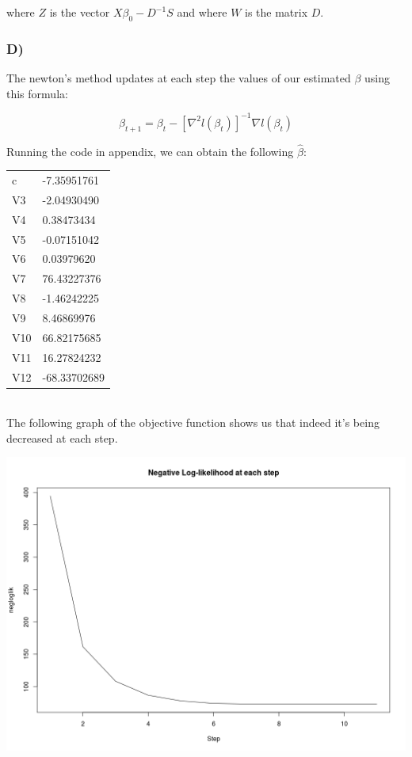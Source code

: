 \documentclass{article}
\begin{document}
where $Z$ is the vector $X\beta_0-D^{-1}S$ and where $W$ is the matrix $D$.

\subsubsection*{D)}

The newton's method updates at each step the values of our estimated $\beta$ using this formula:

\begin{equation*}
\beta_{t+1}=\beta_t-[\nabla^2 l(\beta_t)]^{-1}\nabla l(\beta_t)
\end{equation*}

Running the code in appendix, we can obtain the following $\hat{\beta}$:\\

\begin{tabular}{ll}
c			 &-7.35951761\\
V3           &-2.04930490\\
V4           & 0.38473434\\
V5           &-0.07151042\\
V6           & 0.03979620\\
V7           &76.43227376\\
V8           &-1.46242225\\
V9           & 8.46869976\\
V10          &66.82175685\\
V11          &16.27824232\\
V12          &-68.33702689
\end{tabular}\\

The following graph of the objective function shows us that indeed it's being decreased at each step.

\includegraphics[width=\textwidth]{Rplot_newton.png}
\end{document}

